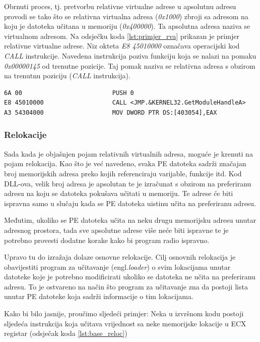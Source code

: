 \documentclass[times, utf8, diplomski, numeric]{fer}
\begin{document}
Obrnuti proces, tj. pretvorbu relativne virtualne adrese u apsolutnu adresu provodi se tako što se relativna virtualna adresa (\emph{0x1000}) zbroji sa adresom na koju je datoteka učitana u memoriju (\emph{0x400000}). Ta apsolutna adresa naziva se virtualnom adresom. Na odsječku koda \ref{lst:primjer_rva} prikazan je primjer relativne virtualne adrese. Niz okteta \emph{E8 45010000} označava operacijski kod \emph{CALL} instrukcije. Navedena instrukcija poziva funkciju koja se nalazi na pomaku \emph{0x00000145} od trenutne pozicije. Taj pomak naziva se relativna adresa s obzirom na trenutnu poziciju (\emph{CALL} instrukcija). 

\begin{lstlisting}[frame=single, caption=Primjer relativne virtualne adrese, label={lst:primjer_rva}]
6A 00	                      PUSH 0
E8 45010000                   CALL <JMP.&KERNEL32.GetModuleHandleA>
A3 54304000                   MOV DWORD PTR DS:[403054],EAX
\end{lstlisting}

\subsubsection{Relokacije}
Sada kada je objašnjen pojam relativnih virtualnih adresa, moguće je krenuti na pojam relokacija. Kao što je već navedeno, svaka PE datoteka sadrži značajan broj memorijskih adresa preko kojih referenciraju varijable, funkcije itd. Kod DLL-ova, velik broj adresa je apsolutan te je izračunat s obzirom na preferiranu adresu na koju se datoteka pokušava učitati u memoriju. Te adrese će biti ispravna samo u slučaju kada se PE datoteka uistinu učita na preferiranu adresu.

Međutim, ukoliko se PE datoteka učita na neku drugu memorijsku adresu unutar adresnog prostora, tada sve apsolutne adrese više neće biti ispravne te je potrebno provesti dodatne korake kako bi program radio ispravno. 

Upravo tu do izražaja dolaze osnovne relokacije. Cilj osnovnih relokacija je obavijestiti program za učitavanje (engl.\emph{loader}) o svim lokacijama unutar datoteke koje je potrebno modificirati ukoliko se datoteka ne učita na preferiranu adresu. To je ostvareno na način što program za učitavanje zna da postoji lista unutar PE datoteke koja sadrži informacije o tim lokacijama.

Kako bi bilo jasnije, proučimo sljedeći primjer: Neka u izvršnom kodu postoji sljedeća instrukcija koja učitava vrijednost sa neke memorijske lokacije u ECX registar (odsječak koda \ref{lst:base_reloc})
\end{document}
